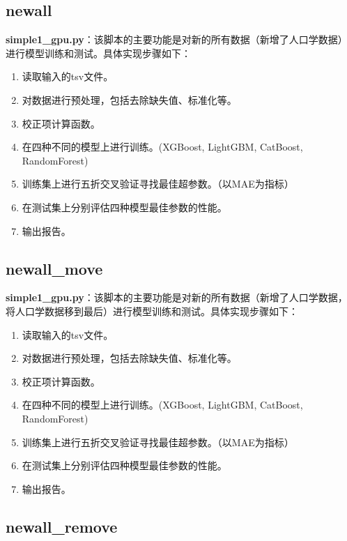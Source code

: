 \documentclass[UTF8]{report}
\theoremstyle{MyLineTheoremStyle} %
\theoremstyle{MyBlockTheoremStyle} %
\theoremstyle{MySubsubsectionStyle} %
\begin{document}
\subsection*{newall}

\textbf{simple1\_gpu.py}：该脚本的主要功能是对新的所有数据（新增了人口学数据）进行模型训练和测试。具体实现步骤如下：
\begin{enumerate}
    \item 读取输入的tsv文件。
    \item 对数据进行预处理，包括去除缺失值、标准化等。
    \item 校正项计算函数。
    \item 在四种不同的模型上进行训练。(XGBoost, LightGBM, CatBoost, RandomForest)
    \item 训练集上进行五折交叉验证寻找最佳超参数。（以MAE为指标）
    \item 在测试集上分别评估四种模型最佳参数的性能。
    \item 输出报告。
\end{enumerate}


\subsection*{newall\_move}

\textbf{simple1\_gpu.py}：该脚本的主要功能是对新的所有数据（新增了人口学数据，将人口学数据移到最后）进行模型训练和测试。具体实现步骤如下：
\begin{enumerate}
    \item 读取输入的tsv文件。
    \item 对数据进行预处理，包括去除缺失值、标准化等。
    \item 校正项计算函数。
    \item 在四种不同的模型上进行训练。(XGBoost, LightGBM, CatBoost, RandomForest)
    \item 训练集上进行五折交叉验证寻找最佳超参数。（以MAE为指标）
    \item 在测试集上分别评估四种模型最佳参数的性能。
    \item 输出报告。
\end{enumerate}


\subsection*{newall\_remove}
\end{document}
